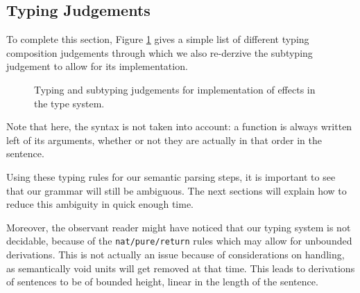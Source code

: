 \subsection{Typing Judgements}\label{subsec:judgements}
To complete this section, Figure \ref{tab:judgements} gives a simple list of different typing composition judgements through which we also re-derzive the subtyping judgement to allow for its implementation.
\begin{figure}
	
	\caption{Typing and subtyping judgements for implementation of effects in the
		type system.}
	\label{tab:judgements}
\end{figure}
Note that here, the syntax is not taken into account: a function is always written left of its arguments, whether or not they are actually in that order in the sentence.

\smallskip

Using these typing rules for our semantic parsing steps, it is important to
see that our grammar will still be ambiguous.
The next sections will explain how to reduce this ambiguity in quick enough
time.

Moreover, the observant reader might have noticed that our typing system is not
decidable, because of the \texttt{nat/pure/return} rules which may allow for
unbounded derivations.
This is not actually an issue because of considerations on handling, as
semantically void units will get removed at that time.
This leads to derivations of sentences to be of bounded height, linear in the
length of the sentence.
